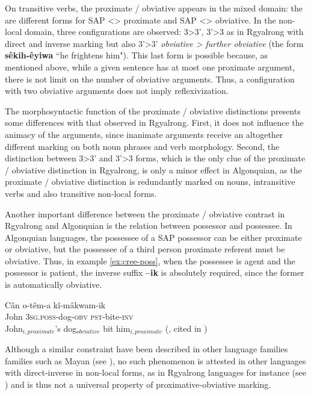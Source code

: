 \documentclass[twoside,a4paper,11pt]{article}
\newcommand{\ipa}[1]{{\phon\textbf{#1}}}
\begin{document}
On transitive verbs, the proximate / obviative appears in the mixed  domain: the are different forms for SAP <> proximate and SAP <> obviative. In the non-local domain, three configurations are observed: 3>3', 3'>3 as in Rgyalrong with direct and inverse marking but also 3'>3' \textit{obviative > further obviative} (the form \ipa{sêkih-êyiwa} ``he frightens him"). This last form is possible because, as mentioned above, while a given sentence has at most one proximate argument, there is not limit on the number of obviative arguments. Thus, a configuration with two obviative arguments does not imply reflexivization.

The morphosyntactic function of the proximate / obviative distinctions presents some differences with that observed in Rgyalrong. First, it does not influence the   animacy of the arguments, since inanimate arguments receive an altogether different marking on both noun phrases and verb morphology. Second, the distinction between 3>3' and 3'>3 forms, which is the only clue of the proximate / obviative distinction in Rgyalrong, is only a minor effect in Algonquian, as the proximate / obviative distinction is redundantly marked on nouns, intransitive verbs and also transitive non-local forms.

Another important difference between the proximate / obviative contrast in Rgyalrong and Algonquian is the relation between possessor and possessee. In Algonquian languages, the possessee of a SAP possessor can be either proximate or obviative, but the possessee of a third person proximate referent must be obviative. Thus, in example \ref{ex:cree-poss}, when the possessee  is agent and the possessor is patient, the inverse suffix \ipa{--ik} is absolutely required, since the former is automatically obviative.



\begin{exe}
\ex \label{ex:cree-poss}
\gll Cân o-têm-a kî-mâkwam-ik \\
John \textsc{3sg.poss}-dog-\textsc{obv} \textsc{pst}-bite-\textsc{inv} \\
\glt John$_{i, proximate}$'s dog$_{obviative}$ bit him$_{i,proximate}$ (\citealt[25]{wolfart73}, cited in \citealt[712]{aissen97obviation})
\end{exe}



Although a similar constraint have been described in other language families families such as Mayan (see \citealt{aissen97obviation}), no such phenomenon is attested in other languages with direct-inverse in non-local forms, as in Rgyalrong languages for instance (see \citealt[141-2]{jacques10inverse}) and is thus not a universal property of proximative-obviative marking.
\end{document}
